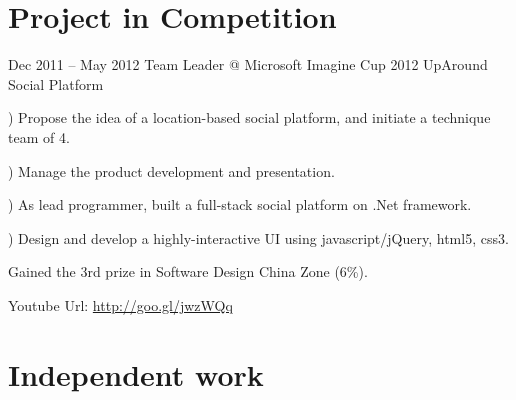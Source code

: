 \documentclass{tccv}
\begin{document}
\section{Project in Competition}
\begin{eventlist}

\item{Dec 2011 -- May 2012}
     {Team Leader @ Microsoft Imagine Cup 2012}
     {UpAround Social Platform}
     
     ) Propose the idea of a location-based social platform, and initiate a technique team of 4.
     
     ) Manage the product development and presentation.
     
     ) As lead programmer, built a full-stack social platform on .Net framework. 
     
     ) Design and develop a highly-interactive UI using javascript/jQuery, html5, css3.
     
Gained the 3rd prize in Software Design China Zone (6\%).   

Youtube Url: \underline{http://goo.gl/jwzWQq}
       
\end{eventlist}

















\section{Independent work}
\end{document}

